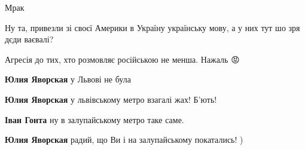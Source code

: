 \begin{itemize}
Мрак

 
Ну та, привезли зі своєї Америки в Україну українську мову, а у них тут шо зря дєди ваєвалі?

 
Агресія до тих, хто розмовляє російською не менша. Нажаль 😡

\begin{itemize}
 
\textbf{Юлия Яворская} у Львові не була

 
\textbf{Юлия Яворская} у львівському метро взагалі жах! Б'ють!

 
\textbf{Іван Гонта} ну в залупайському метро таке саме.

 
\textbf{Юлия Яворская} радий, що Ви і на залупайському покатались! )
\end{itemize}

 

\end{itemize}
